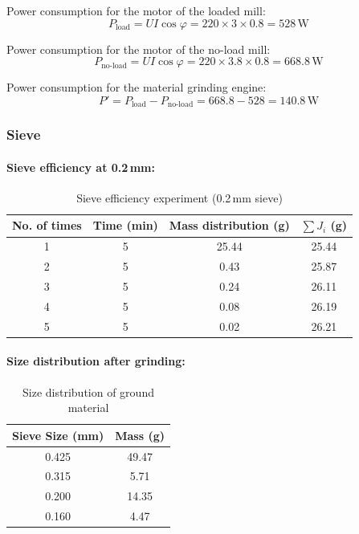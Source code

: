 Power consumption for the motor of the loaded mill:
\begin{equation*}
    P_{\text{load}} = UI\cos\varphi = 220 \times 3 \times 0.8 = 528\,\text{W}
\end{equation*}

Power consumption for the motor of the no-load mill:
\begin{equation*}
    P_{\text{no-load}} = UI\cos\varphi = 220 \times 3.8 \times 0.8 = 668.8\,\text{W}
\end{equation*}

Power consumption for the material grinding engine:
\begin{equation*}
    P' = P_{\text{load}} - P_{\text{no-load}} = 668.8 - 528 = 140.8\,\text{W}
\end{equation*}

\subsubsection{Sieve}

\paragraph{Sieve efficiency at 0.2\,mm:}

\begin{table}[H]
    \centering
    \caption{Sieve efficiency experiment (0.2\,mm sieve)}
    \begin{tabular}{cccc}
        \hline
        \textbf{No. of times} & \textbf{Time (min)} & \textbf{Mass distribution (g)} & \textbf{$\sum J_i$ (g)} \\
        \hline
        1 & 5 & 25.44 & 25.44 \\
        2 & 5 & 0.43  & 25.87 \\
        3 & 5 & 0.24  & 26.11 \\
        4 & 5 & 0.08  & 26.19 \\
        5 & 5 & 0.02  & 26.21 \\
        \hline
    \end{tabular}
\end{table}

\paragraph{Size distribution after grinding:}

\begin{table}[H]
    \centering
    \caption{Size distribution of ground material}
    \begin{tabular}{cc}
        \hline
        \textbf{Sieve Size (mm)} & \textbf{Mass (g)} \\
        \hline
        0.425 & 49.47 \\
        0.315 & 5.71  \\
        0.200 & 14.35 \\
        0.160 & 4.47  \\
        \hline
    \end{tabular}
\end{table}

